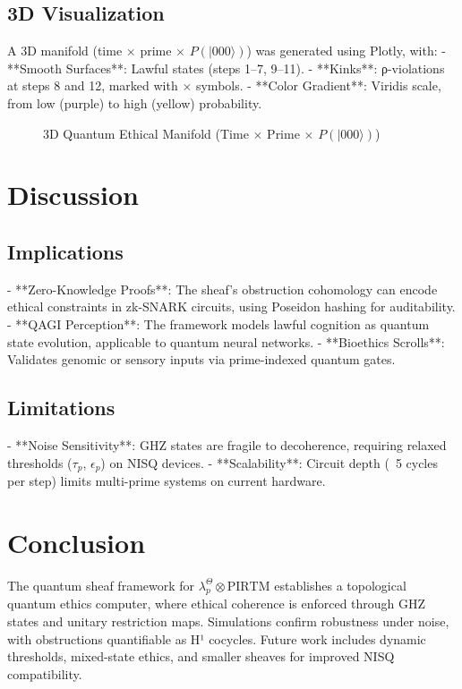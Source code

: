\documentclass{article}
\begin{document}
\subsection{3D Visualization}
A 3D manifold (time $\times$ prime $\times$ $P(|000\rangle)$) was generated using Plotly, with:
- **Smooth Surfaces**: Lawful states (steps 1–7, 9–11).
- **Kinks**: ρ-violations at steps 8 and 12, marked with × symbols.
- **Color Gradient**: Viridis scale, from low (purple) to high (yellow) probability.

\begin{figure}[h]
\centering
\caption{3D Quantum Ethical Manifold (Time $\times$ Prime $\times$ $P(|000\rangle)$)}
\end{figure}

\section{Discussion}

\subsection{Implications}
- **Zero-Knowledge Proofs**: The sheaf’s obstruction cohomology can encode ethical constraints in zk-SNARK circuits, using Poseidon hashing for auditability.
- **QAGI Perception**: The framework models lawful cognition as quantum state evolution, applicable to quantum neural networks.
- **Bioethics Scrolls**: Validates genomic or sensory inputs via prime-indexed quantum gates.

\subsection{Limitations}
- **Noise Sensitivity**: GHZ states are fragile to decoherence, requiring relaxed thresholds ($\tau_p$, $\epsilon_p$) on NISQ devices.
- **Scalability**: Circuit depth (~5 cycles per step) limits multi-prime systems on current hardware.

\section{Conclusion}
The quantum sheaf framework for $\lambda_p^\Theta \otimes \text{PIRTM}$ establishes a topological quantum ethics computer, where ethical coherence is enforced through GHZ states and unitary restriction maps. Simulations confirm robustness under noise, with obstructions quantifiable as H¹ cocycles. Future work includes dynamic thresholds, mixed-state ethics, and smaller sheaves for improved NISQ compatibility.
\end{document}
